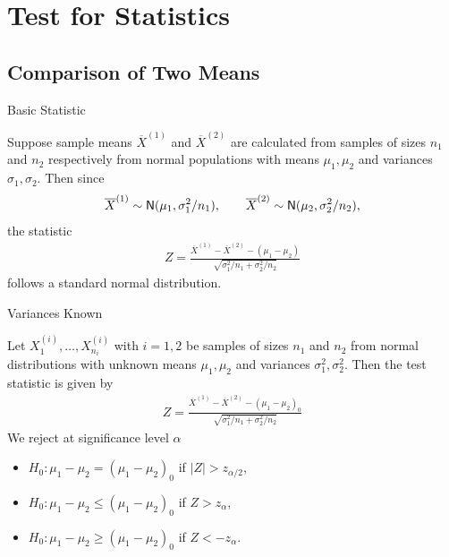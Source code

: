 \section{Test for Statistics}

\subsection{Comparison of Two Means}

\begin{frame}{Basic Statistic}

\justifying
Suppose sample means $\overline{X}^{(1)}$ and $\overline{X}^{(2)}$ are calculated from samples of sizes $n_1$ and $n_2$ respectively from normal populations with means $\mu_1, \mu_2$ and variances $\sigma_1, \sigma_2$. Then since
\begin{align*}
\overline{X}^{(1)}\sim \mathsf{N}(\mu_1, \sigma_1^2/n_1), \qquad \overline{X}^{(2)} \sim \mathsf{N}(\mu_2, \sigma_2^2/n_2),
\end{align*}
the statistic
\begin{align*}
Z = \frac{\overline{X}^{(1)} - \overline{X}^{(2)} - (\mu_1 - \mu_2)}{\sqrt{\sigma_1^2/n_1 + \sigma_2^2/n_2}}
\end{align*}
follows a standard normal distribution.

\end{frame}


\begin{frame}{Variances Known}

\justifying
{} Let $X_1^{(i)}, \ldots, X_{n_i}^{(i)}$ with $i = 1, 2$ be samples of sizes $n_1$ and $n_2$ from normal distributions with unknown means $\mu_1, \mu_2$ and  variances $\sigma_1^2, \sigma_2^2$. Then the test statistic is given by
\begin{align*}
Z = \frac{\overline{X}^{(1)} - \overline{X}^{(2)} - (\mu_1 - \mu_2)_0}{\sqrt{\sigma_1^2/n_1 + \sigma_2^2/n_2}}
\end{align*}
We reject at significance level $\alpha$
\begin{itemize}
	\item $H_0: \mu_1 - \mu_2 = (\mu_1-\mu_2)_0$ if $|Z| > z_{\alpha/2}$,
	\item $H_0: \mu_1 - \mu_2 \leq (\mu_1-\mu_2)_0$ if $Z > z_{\alpha}$,
	\item $H_0: \mu_1 - \mu_2 \geq (\mu_1-\mu_2)_0$ if $Z < -z_{\alpha}$.
\end{itemize}

\end{frame}


